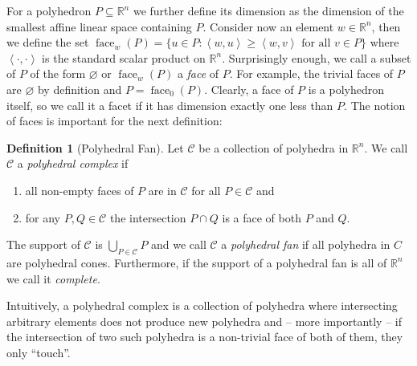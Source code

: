 \documentclass[
  paper=a4,
  DIV=14,
  fontsize=12pt,
  titlepage,
  bibliography=totoc,
  listof=totoc,
  pagesize=pdftex
]{scrartcl}
\numberwithin{figure}{section}
\numberwithin{equation}{section}
\numberwithin{table}{section}
\newcommand*\setR{\mathds{R}}
\newcommand*\ideal[1]{\left\langle #1 \right\rangle}
\DeclareMathOperator{\face}{face}
\theoremstyle{definition}
\newtheorem{definition}{Definition}
\numberwithin{definition}{section}
\begin{document}
For a polyhedron $P \subseteq \setR^n$ we further define its dimension as the dimension of
the smallest affine linear space containing $P$. Consider now an element $w \in \setR^n$,
then we define the set $\face_w(P) = \{ u \in P : \ideal{w,u} \geq \ideal{w,v} \text{ for
all } v\in P\}$ where $\ideal{\cdot,\cdot}$ is the standard scalar product on $\setR^n$.
Surprisingly enough, we call a subset of $P$ of the form $\varnothing$ or $\face_w(P)$ a
\emph{face} of $P$. For example, the trivial faces of $P$ are $\varnothing$ by definition
and $P = \face_0(P)$. Clearly, a face of $P$ is a polyhedron itself, so we call it a facet
if it has dimension exactly one less than $P$. The notion of faces is important for the
next definition:

\begin{definition}[Polyhedral Fan]
  Let $\mathcal C$ be a collection of polyhedra in $\setR^n$. We call $\mathcal C$ a
  \emph{polyhedral complex} if
  \begin{enumerate}
    \item all non-empty faces of $P$ are in $\mathcal C$ for all $P \in \mathcal C$ and
    \item for any $P,Q \in \mathcal C$ the intersection $P\cap Q$ is a face of both $P$
      and $Q$.
  \end{enumerate}
  The support of $\mathcal C$ is $\bigcup_{P\in\mathcal C}P$ and we call $\mathcal C$ a
  \emph{polyhedral fan} if all polyhedra in $C$ are polyhedral cones. Furthermore, if the
  support of a polyhedral fan is all of $\setR^n$ we call it \emph{complete}.
  \label{def:polyhedralFan}
\end{definition}

Intuitively, a polyhedral complex is a collection of polyhedra where intersecting
arbitrary elements does not produce new polyhedra and -- more importantly -- if the
intersection of two such polyhedra is a non-trivial face of both of them, they only
\enquote{touch}.
\end{document}
